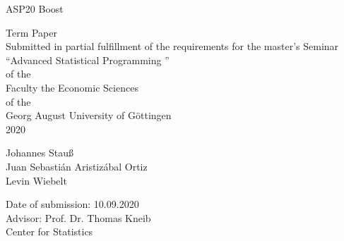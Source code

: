 \begin{titlepage}
\vspace*{3.5cm}
\centering
{\LARGE ASP20 Boost}\\[2\baselineskip]
{\LARGE  Term Paper  \\
 Submitted in partial fulfillment of the requirements for the  master's Seminar\\
\textquotedblleft Advanced Statistical Programming \textquotedblright\ \\
of the \\
Faculty the Economic Sciences \\
of the \\
Georg August University of Göttingen\\
2020 \par}
\vspace*{\fill}
\begin{flushleft}
Johannes Stauß\\
Juan Sebastián Aristizábal Ortiz\\
Levin Wiebelt

Date of submission: 10.09.2020\\
\vspace{10mm}
Advisor: Prof. Dr. Thomas Kneib\\
Center for Statistics\\
\end{flushleft}
\thispagestyle{empty}
\end{titlepage}
